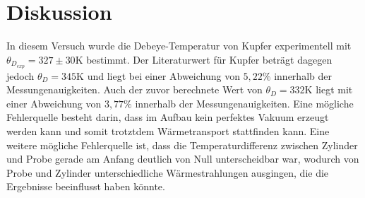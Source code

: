 \section{Diskussion}
In diesem Versuch wurde die Debeye-Temperatur von Kupfer experimentell mit \\$\theta_{D_{exp}} = 327 \pm 30 \si{\kelvin}$ bestimmt.
Der Literaturwert für Kupfer beträgt dagegen jedoch $\theta_{D} = 345 \si{\kelvin}$ und liegt bei einer Abweichung von $5,22 \%$ innerhalb der Messungenauigkeiten.
Auch der zuvor berechnete Wert von $\theta_{D} = 332 \si{\kelvin}$ liegt mit einer Abweichung von $3,77\%$ innerhalb der Messungenauigkeiten.
Eine mögliche Fehlerquelle besteht darin, dass im Aufbau kein perfektes Vakuum erzeugt werden kann und somit trotztdem Wärmetransport stattfinden kann.
Eine weitere mögliche Fehlerquelle ist, dass die Temperaturdifferenz zwischen Zylinder und Probe gerade am Anfang deutlich von Null unterscheidbar war, wodurch von Probe und Zylinder unterschiedliche Wärmestrahlungen ausgingen, die die Ergebnisse beeinflusst haben könnte.
